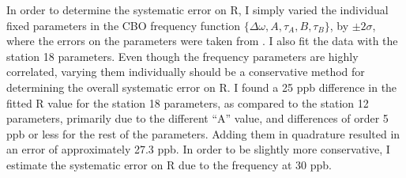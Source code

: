 	In order to determine the systematic error on R, I simply varied the individual fixed parameters in the CBO frequency function $\{\Delta\omega, A, \tau_{A}, B, \tau_{B}\}$, by $\pm 2 \sigma$, where the errors on the parameters were taken from . I also fit the data with the station 18 parameters. Even though the frequency parameters are highly correlated, varying them individually should be a conservative method for determining the overall systematic error on R. I found a 25 ppb difference in the fitted R value for the station 18 parameters, as compared to the station 12 parameters, primarily due to the different ``A'' value, and differences of order 5 ppb or less for the rest of the parameters. Adding them in quadrature resulted in an error of approximately 27.3 ppb. In order to be slightly more conservative, I estimate the systematic error on R due to the frequency at 30 ppb.

